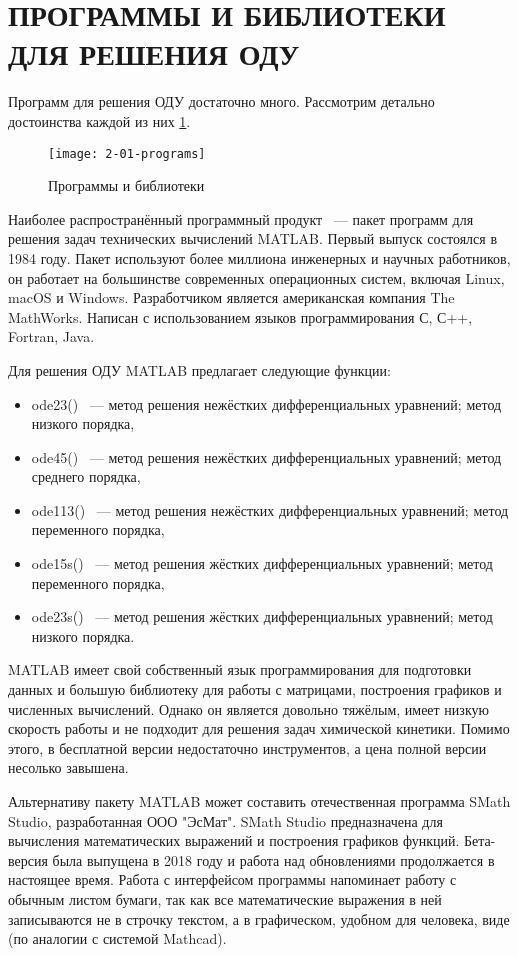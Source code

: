 \section{ПРОГРАММЫ И БИБЛИОТЕКИ ДЛЯ РЕШЕНИЯ ОДУ}

Программ для решения ОДУ достаточно много. Рассмотрим детально достоинства каждой из них \ref{fig:programs}.

\begin{figure}
    \texttt{[image: 2-01-programs]}
    \caption{Программы и библиотеки}
    \label{fig:programs}
\end{figure}

Наиболее распространённый программный продукт ~--- пакет программ для решения задач технических вычислений MATLAB. Первый выпуск состоялся в 1984 году. Пакет используют
более миллиона инженерных и научных работников, он работает на большинстве современных операционных систем, включая Linux, macOS и
Windows. Разработчиком является американская компания The MathWorks. Написан с использованием языков программирования С, С++, Fortran,
Java.

Для решения ОДУ MATLAB предлагает следующие функции:
\begin{itemize}
    \item ode23() ~--- метод решения нежёстких дифференциальных уравнений; метод низкого порядка,
    \item ode45() ~--- метод решения нежёстких дифференциальных уравнений; метод среднего порядка,
    \item ode113() ~--- метод решения нежёстких дифференциальных уравнений; метод переменного порядка,
    \item ode15s() ~--- метод решения жёстких дифференциальных уравнений; метод переменного порядка,
    \item ode23s() ~--- метод решения жёстких дифференциальных уравнений; метод низкого порядка.
\end{itemize}

MATLAB имеет свой собственный язык программирования для подготовки данных и большую библиотеку для работы с матрицами, построения
графиков и численных вычислений. Однако он является довольно тяжёлым, имеет низкую скорость работы и не
подходит для решения задач химической кинетики. Помимо этого, в бесплатной версии недостаточно инструментов, а цена полной версии
несолько завышена.

Альтернативу пакету MATLAB может составить отечественная программа SMath Studio, разработанная ООО "ЭсМат".
SMath Studio предназначена для вычисления математических выражений и построения графиков функций. Бета-версия была выпущена в 2018
году и работа над обновлениями продолжается в настоящее время. Работа с интерфейсом
программы напоминает работу с обычным листом бумаги, так как все математические выражения в ней записываются не в строчку текстом,
а в графическом, удобном для человека, виде (по аналогии с системой Mathcad).

